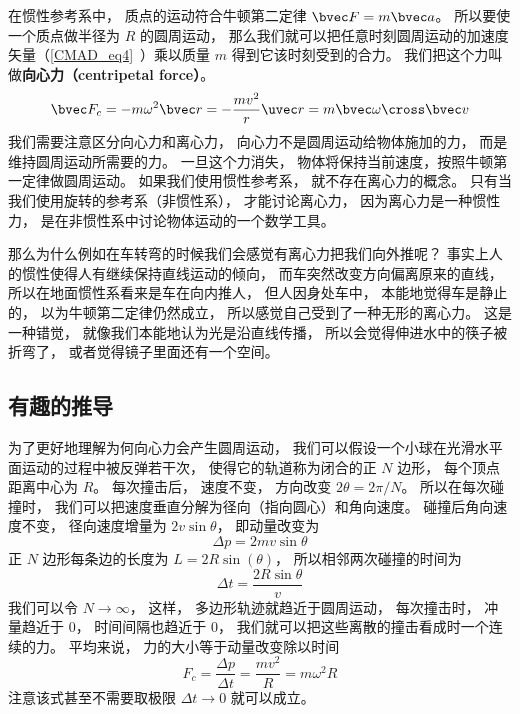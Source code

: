 

在惯性参考系中， 质点的运动符合牛顿第二定律 $\bvec F = m\bvec a$。 所以要使一个质点做半径为 $R$ 的圆周运动， 那么我们就可以把任意时刻圆周运动的加速度矢量（\autoref{CMAD_eq4}~）乘以质量 $m$ 得到它该时刻受到的合力。 我们把这个力叫做\textbf{向心力（centripetal force）}。
\begin{equation}
\bvec F_c = -m \omega^2 \bvec r = -\frac{mv^2}{r}\uvec r = m\bvec \omega \cross \bvec v
\end{equation}
我们需要注意区分向心力和离心力， 向心力不是圆周运动给物体施加的力， 而是维持圆周运动所需要的力。 一旦这个力消失， 物体将保持当前速度，按照牛顿第一定律做圆周运动。 如果我们使用惯性参考系， 就不存在离心力的概念。 只有当我们使用旋转的参考系（非惯性系）， 才能讨论离心力， 因为离心力是一种惯性力， 是在非惯性系中讨论物体运动的一个数学工具。

那么为什么例如在车转弯的时候我们会感觉有离心力把我们向外推呢？ 事实上人的惯性使得人有继续保持直线运动的倾向， 而车突然改变方向偏离原来的直线， 所以在地面惯性系看来是车在向内推人， 但人因身处车中， 本能地觉得车是静止的， 以为牛顿第二定律仍然成立， 所以感觉自己受到了一种无形的离心力。 这是一种错觉， 就像我们本能地认为光是沿直线传播， 所以会觉得伸进水中的筷子被折弯了， 或者觉得镜子里面还有一个空间。

\subsection{有趣的推导}
为了更好地理解为何向心力会产生圆周运动， 我们可以假设一个小球在光滑水平面运动的过程中被反弹若干次， 使得它的轨道称为闭合的正 $N$ 边形， 每个顶点距离中心为 $R$。 每次撞击后， 速度不变， 方向改变 $2\theta  = 2\pi/N$。
所以在每次碰撞时， 我们可以把速度垂直分解为径向（指向圆心）和角向速度。 碰撞后角向速度不变， 径向速度增量为 $2v\sin\theta$， 即动量改变为
\begin{equation}
\Delta p = 2mv\sin\theta
\end{equation}
正 $N$ 边形每条边的长度为 $L = 2R\sin(\theta)$， 所以相邻两次碰撞的时间为
\begin{equation}
\Delta t = \frac{2R\sin\theta}{v}
\end{equation}
我们可以令 $N \to \infty$， 这样， 多边形轨迹就趋近于圆周运动， 每次撞击时， 冲量趋近于 0， 时间间隔也趋近于 0， 我们就可以把这些离散的撞击看成时一个连续的力。 平均来说， 力的大小等于动量改变除以时间
\begin{equation}
F_c = \frac{\Delta p}{\Delta t} = \frac{mv^2}{R} = m\omega^2 R
\end{equation}
注意该式甚至不需要取极限 $\Delta t \to 0$ 就可以成立。

